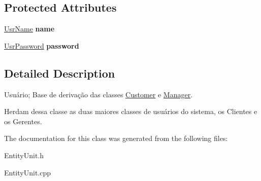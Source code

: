 \subsection*{Protected Attributes}
\begin{DoxyCompactItemize}
\item 
\hypertarget{classUser_a578e38a0fc23375ce19d689f96c6abaa}{\hyperlink{classUsrName}{Usr\-Name} {\bfseries name}}\label{classUser_a578e38a0fc23375ce19d689f96c6abaa}

\item 
\hypertarget{classUser_a84c5ed822199a90e753ebfc54262fde8}{\hyperlink{classUsrPassword}{Usr\-Password} {\bfseries password}}\label{classUser_a84c5ed822199a90e753ebfc54262fde8}

\end{DoxyCompactItemize}


\subsection{Detailed Description}
Usuário; Base de derivação das classes \hyperlink{classCustomer}{Customer} e \hyperlink{classManager}{Manager}. 

Herdam dessa classe as duas maiores classes de usuários do sistema, os Clientes e os Gerentes. 

The documentation for this class was generated from the following files\-:\begin{DoxyCompactItemize}
\item 
Entity\-Unit.\-h\item 
Entity\-Unit.\-cpp\end{DoxyCompactItemize}
